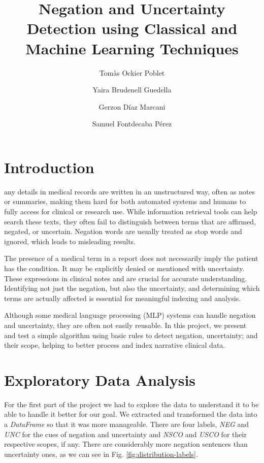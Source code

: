 \documentclass[9pt,a4paper,twoside]{tau-class/tau}
\title{Negation and Uncertainty Detection using Classical and Machine Learning Techniques}
\author[a]{Tomàs Ockier Poblet}
\author[b]{Yaira Brudenell Guedella}
\author[c]{Gerzon Díaz Marcani}
\author[d]{Samuel Fontdecaba Pérez}
\affil[a]{1707185}
\affil[b]{1707353}
\affil[c]{1704153}
\affil[d]{1706954}
\begin{document}
    \maketitle 
    \thispagestyle{firststyle} \tauabstract 
    \tableofcontents
    \linenumbers 
    

\section{Introduction}

    any details in medical records are written in an unstructured way, often as notes or summaries, making them hard for both automated systems and humans to fully access for clinical or research use. While information retrieval tools can help search these texts, they often fail to distinguish between terms that are affirmed, negated, or uncertain. Negation words are usually treated as stop words and ignored, which leads to misleading results.
    
    The presence of a medical term in a report does not necessarily imply the patient has the condition. It may be explicitly denied or mentioned with uncertainty. These expressions in clinical notes and are crucial for accurate understanding. Identifying not just the negation, but also the uncertainty, and determining which terms are actually affected is essential for meaningful indexing and analysis.
    
    Although some medical language processing (MLP) systems can handle negation and uncertainty, they are often not easily reusable. In this project, we present and test a simple algorithm using basic rules to detect negation, uncertainty; and their scope, helping to better process and index narrative clinical data.

\section{Exploratory Data Analysis}

	For the first part of the project we had to explore the data to understand it to be able to handle it better for our goal. We extracted and transformed the data into a \textit{DataFrame} so that it was more manageable. 
    There are four labels, \textit{NEG} and \textit{UNC} for the cues of negation and uncertainty and \textit{NSCO} and \textit{USCO} for their respective scopes, if any. 
    There are considerably more negation sentences than uncertainty ones, as we can see in Fig. \ref{fig:distribution-labels}.
    
\end{document}
